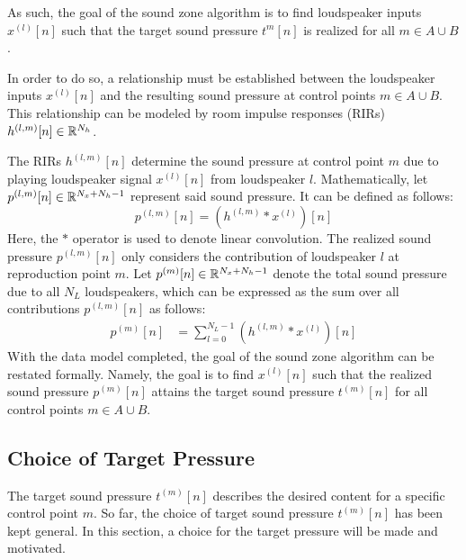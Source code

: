 As such, the goal of the sound zone algorithm is to find loudspeaker inputs $x^{(l)}[n]$ 
such that the target sound pressure $t^{m}[n]$ is realized for all $m\in A \cup B$.

In order to do so, a relationship must be established between the loudspeaker inputs $x^{(l)}[n]$
and the resulting sound pressure at control points $m\in A \cup B$. 
This relationship can be modeled by room impulse responses (RIRs) $h^{(l,m)}[n]\in\mathbb{R}^{N_h}$.

The RIRs $h^{(l,m)}[n]$ determine the sound pressure at control point $m$ due to playing loudspeaker signal $x^{(l)}[n]$ from loudspeaker $l$. 
Mathematically, let $p^{(l,m)}[n]\in\mathbb{R}^{N_x + N_h - 1}$ represent said sound pressure. 
It can be defined as follows:
\begin{equation}
    p^{(l,m)}[n] = \left(h^{(l,m)} \ast x^{(l)}\right)[n]
\end{equation}
Here, the $\ast$ operator is used to denote linear convolution. 
The realized sound pressure $p^{(l,m)}[n]$ only considers the contribution of loudspeaker $l$ at reproduction point $m$.
Let $p^{(m)}[n]\in\mathbb{R}^{N_x + N_h - 1}$ denote the total sound pressure due to all $N_L$ loudspeakers,
which can be expressed as the sum over all contributions $p^{(l,m)}[n]$ as follows: 
\begin{align}
    p^{(m)}[n] &= \sum_{l=0}^{N_L - 1} \left(h^{(l,m)} \ast x^{(l)}\right)[n]
\end{align}
With the data model completed, the goal of the sound zone algorithm can be restated formally.
Namely, the goal is to find $x^{(l)}[n]$ such that the realized sound pressure $p^{(m)}[n]$ attains the
target sound pressure $t^{(m)}[n]$ for all control points $m\in A \cup B$.

\subsection{Choice of Target Pressure}
\label{ch:sound_zone:data_model:target_pressure_choice}
The target sound pressure $t^{(m)}[n]$ describes the desired content for a specific control point $m$. 
So far, the choice of target sound pressure $t^{(m)}[n]$ has been kept general. 
In this section, a choice for the target pressure will be made and motivated.

